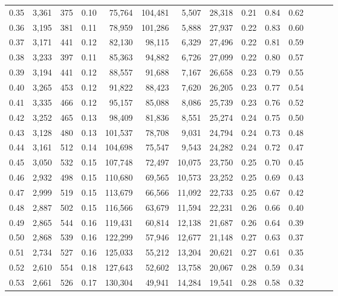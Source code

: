 \begin{tabular}{rrrrrrrrrrrrrr}
0.35 &  3,361 &    375 &  0.10 &   75,764 &  104,481 &   5,507 &  28,318 &  0.21 &  0.84 &      0.62 \\
0.36 &  3,195 &    381 &  0.11 &   78,959 &  101,286 &   5,888 &  27,937 &  0.22 &  0.83 &      0.60 \\
0.37 &  3,171 &    441 &  0.12 &   82,130 &   98,115 &   6,329 &  27,496 &  0.22 &  0.81 &      0.59 \\
0.38 &  3,233 &    397 &  0.11 &   85,363 &   94,882 &   6,726 &  27,099 &  0.22 &  0.80 &      0.57 \\
0.39 &  3,194 &    441 &  0.12 &   88,557 &   91,688 &   7,167 &  26,658 &  0.23 &  0.79 &      0.55 \\
0.40 &  3,265 &    453 &  0.12 &   91,822 &   88,423 &   7,620 &  26,205 &  0.23 &  0.77 &      0.54 \\
0.41 &  3,335 &    466 &  0.12 &   95,157 &   85,088 &   8,086 &  25,739 &  0.23 &  0.76 &      0.52 \\
0.42 &  3,252 &    465 &  0.13 &   98,409 &   81,836 &   8,551 &  25,274 &  0.24 &  0.75 &      0.50 \\
0.43 &  3,128 &    480 &  0.13 &  101,537 &   78,708 &   9,031 &  24,794 &  0.24 &  0.73 &      0.48 \\
0.44 &  3,161 &    512 &  0.14 &  104,698 &   75,547 &   9,543 &  24,282 &  0.24 &  0.72 &      0.47 \\
0.45 &  3,050 &    532 &  0.15 &  107,748 &   72,497 &  10,075 &  23,750 &  0.25 &  0.70 &      0.45 \\
0.46 &  2,932 &    498 &  0.15 &  110,680 &   69,565 &  10,573 &  23,252 &  0.25 &  0.69 &      0.43 \\
0.47 &  2,999 &    519 &  0.15 &  113,679 &   66,566 &  11,092 &  22,733 &  0.25 &  0.67 &      0.42 \\
0.48 &  2,887 &    502 &  0.15 &  116,566 &   63,679 &  11,594 &  22,231 &  0.26 &  0.66 &      0.40 \\
0.49 &  2,865 &    544 &  0.16 &  119,431 &   60,814 &  12,138 &  21,687 &  0.26 &  0.64 &      0.39 \\
0.50 &  2,868 &    539 &  0.16 &  122,299 &   57,946 &  12,677 &  21,148 &  0.27 &  0.63 &      0.37 \\
0.51 &  2,734 &    527 &  0.16 &  125,033 &   55,212 &  13,204 &  20,621 &  0.27 &  0.61 &      0.35 \\
0.52 &  2,610 &    554 &  0.18 &  127,643 &   52,602 &  13,758 &  20,067 &  0.28 &  0.59 &      0.34 \\
0.53 &  2,661 &    526 &  0.17 &  130,304 &   49,941 &  14,284 &  19,541 &  0.28 &  0.58 &      0.32 \\

\end{tabular}
